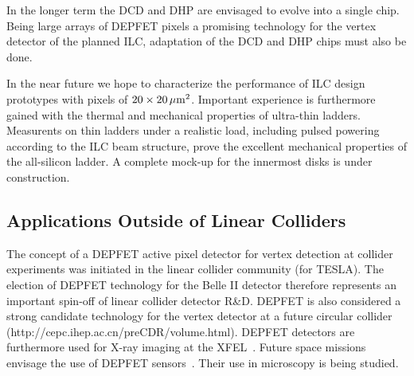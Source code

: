 In the longer term the DCD and DHP are envisaged to evolve into a single chip. Being large arrays of DEPFET pixels a promising technology for the vertex detector of the planned ILC, adaptation of the DCD and DHP chips must also be done.

 In the near future we hope to characterize the performance of ILC design prototypes with pixels of $20 \times \unit[20]{\micron^2}$.
Important experience is furthermore gained with the thermal and mechanical properties of ultra-thin ladders. Measurents on thin ladders under a realistic load, including pulsed powering according to the ILC beam structure, prove the excellent mechanical properties of the all-silicon ladder. A complete mock-up for the innermost disks is under construction.

\subsection{Applications Outside of Linear Colliders}
The concept of a DEPFET active pixel detector for vertex detection at collider experiments was initiated in the linear collider community (for TESLA). The election of DEPFET technology for the Belle II detector therefore represents an important spin-off of linear collider detector R\&D. DEPFET is also considered a strong candidate technology for the vertex detector at a future circular collider (http://cepc.ihep.ac.cn/preCDR/volume.html). DEPFET detectors are furthermore used for X-ray imaging at the XFEL~\cite{xfel}. Future space missions envisage the use of DEPFET sensors~\cite{bepicolombo}. Their use in microscopy is being studied.
